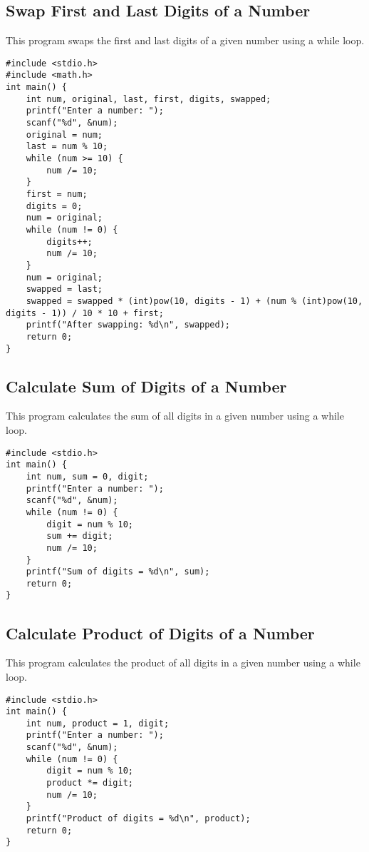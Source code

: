 \documentclass[a4paper,12pt]{article}
\begin{document}
\newpage

\subsection{Swap First and Last Digits of a Number}
This program swaps the first and last digits of a given number using a while loop.

\begin{lstlisting}[caption={Swap First and Last Digits of a Number}]
#include <stdio.h>
#include <math.h>
int main() {
    int num, original, last, first, digits, swapped;
    printf("Enter a number: ");
    scanf("%d", &num);
    original = num;
    last = num % 10;
    while (num >= 10) {
        num /= 10;
    }
    first = num;
    digits = 0;
    num = original;
    while (num != 0) {
        digits++;
        num /= 10;
    }
    num = original;
    swapped = last;
    swapped = swapped * (int)pow(10, digits - 1) + (num % (int)pow(10, digits - 1)) / 10 * 10 + first;
    printf("After swapping: %d\n", swapped);
    return 0;
}
\end{lstlisting}

\newpage

\subsection{Calculate Sum of Digits of a Number}
This program calculates the sum of all digits in a given number using a while loop.

\begin{lstlisting}[caption={Calculate Sum of Digits of a Number}]
#include <stdio.h>
int main() {
    int num, sum = 0, digit;
    printf("Enter a number: ");
    scanf("%d", &num);
    while (num != 0) {
        digit = num % 10;
        sum += digit;
        num /= 10;
    }
    printf("Sum of digits = %d\n", sum);
    return 0;
}
\end{lstlisting}

\newpage

\subsection{Calculate Product of Digits of a Number}
This program calculates the product of all digits in a given number using a while loop.

\begin{lstlisting}[caption={Calculate Product of Digits of a Number}]
#include <stdio.h>
int main() {
    int num, product = 1, digit;
    printf("Enter a number: ");
    scanf("%d", &num);
    while (num != 0) {
        digit = num % 10;
        product *= digit;
        num /= 10;
    }
    printf("Product of digits = %d\n", product);
    return 0;
}
\end{lstlisting}
\end{document}
